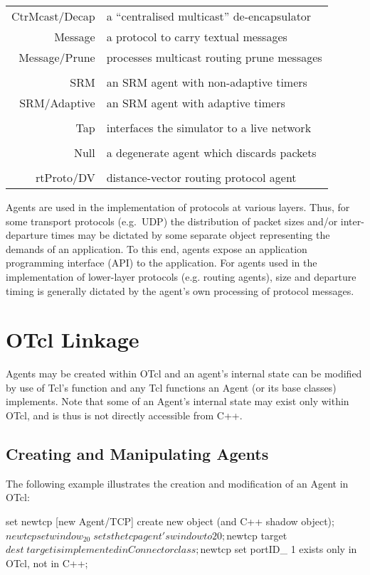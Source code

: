 \begin{longtable}{rl}
  CtrMcast/Decap & a ``centralised multicast'' de-encapsulator  \\
  Message & a protocol to carry textual messages        \\
  Message/Prune & processes multicast routing prune messages    \\
        \\
  SRM & an SRM agent with non-adaptive timers   \\
  SRM/Adaptive & an SRM agent with adaptive timers      \\
        \\
  Tap & interfaces the simulator to a live network      \\
        \\
  Null & a degenerate agent which discards packets      \\
        \\
  rtProto/DV & distance-vector routing protocol agent   \\
\end{longtable}

Agents are used in the implementation of protocols at various layers.
Thus, for some transport protocols (e.g.~UDP) the distribution
of packet sizes and/or inter-departure times
may be dictated by some separate
object representing the demands of an application.  To this end, agents
expose an application programming interface (API) to the application.
For agents used in the implementation of lower-layer protocols
(e.g. routing agents), size and departure timing is generally dictated
by the agent's own processing of protocol messages.

\section{OTcl Linkage}
\label{sec:agentotcl}

Agents may be created within OTcl and an agent's internal
state can be modified by use of Tcl's  function and
any Tcl functions an Agent (or its base classes) implements.
Note that some of an Agent's internal state may exist
only within OTcl, and is thus is not directly accessible from C++.

\subsection{Creating and Manipulating Agents}
\label{sec:agentcreateotcl}

The following example illustrates the creation and modification
of an Agent in OTcl:
\begin{program}
        set newtcp [new Agent/TCP] \; create new object (and C++ shadow object);
        $newtcp set window_ 20 \; sets the tcp agent's window to 20;
        $newtcp target $dest \; target is implemented in Connector class;
        $newtcp set portID_ 1 \; exists only in OTcl, not in C++;
\end{program}


